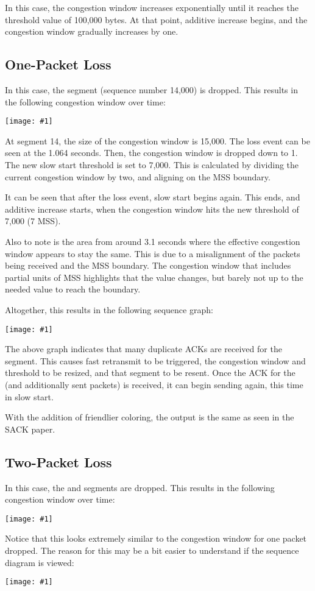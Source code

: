 \documentclass[fleqn,11pt]{article}
\newcommand{\graph}[2]{\begin{center}\texttt{[image: \#1]}\end{center}}
\newcommand{\cwnd}[1]{\graph{#1/cwnd}{height=3.5in}}
\newcommand{\sequence}[1]{\graph{#1/sequence}{}}
\begin{document}
In this case, the congestion window increases exponentially until it reaches the threshold value of 100,000 bytes.
At that point, additive increase begins, and the congestion window gradually increases by one.

\subsection{One-Packet Loss}
In this case, the  segment (sequence number 14,000) is dropped.
This results in the following congestion window over time:
\cwnd{tahoe-1}

At segment 14, the size of the congestion window is 15,000.
The loss event can be seen at the 1.064 seconds.
Then, the congestion window is dropped down to 1.
The new slow start threshold is set to 7,000.
This is calculated by dividing the current congestion window by two, and aligning on the  MSS boundary.

It can be seen that after the loss event, slow start begins again.
This ends, and additive increase starts, when the congestion window hits the new threshold of 7,000 (7 MSS).

Also to note is the area from around 3.1 seconds where the effective congestion window appears to stay the same.
This is due to a misalignment of the packets being received and the MSS boundary.
The congestion window that includes partial units of MSS highlights that the value changes, but barely not up to the needed value to reach the boundary.


Altogether, this results in the following sequence graph:
\sequence{tahoe-1}

The above graph indicates that many duplicate ACKs are received for the  segment.
This causes fast retransmit to be triggered, the congestion window and threshold to be resized, and that segment to be resent.
Once the ACK for the  (and additionally sent packets) is received, it can begin sending again, this time in slow start.

With the addition of friendlier coloring, the output is the same as seen in the SACK paper.

\subsection{Two-Packet Loss}
In this case, the  and  segments are dropped.
This results in the following congestion window over time:
\cwnd{tahoe-2}

Notice that this looks extremely similar to the congestion window for one packet dropped.
The reason for this may be a bit easier to understand if the sequence diagram is viewed:
\sequence{tahoe-2}
\end{document}
